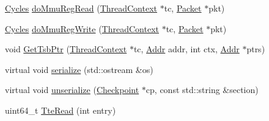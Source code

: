 \begin{DoxyCompactItemize}
\item 
\hyperlink{classCycles}{Cycles} \hyperlink{classSparcISA_1_1TLB_ac90a1eb3091d70b4d1465154d799db46}{doMmuRegRead} (\hyperlink{classThreadContext}{ThreadContext} $\ast$tc, \hyperlink{classPacket}{Packet} $\ast$pkt)
\item 
\hyperlink{classCycles}{Cycles} \hyperlink{classSparcISA_1_1TLB_acdfde16dc50b29fe74f4b7c3f9711d43}{doMmuRegWrite} (\hyperlink{classThreadContext}{ThreadContext} $\ast$tc, \hyperlink{classPacket}{Packet} $\ast$pkt)
\item 
void \hyperlink{classSparcISA_1_1TLB_ab52a39898286d036febd5dcb6d0b376a}{GetTsbPtr} (\hyperlink{classThreadContext}{ThreadContext} $\ast$tc, \hyperlink{base_2types_8hh_af1bb03d6a4ee096394a6749f0a169232}{Addr} addr, int ctx, \hyperlink{base_2types_8hh_af1bb03d6a4ee096394a6749f0a169232}{Addr} $\ast$ptrs)
\item 
virtual void \hyperlink{classSparcISA_1_1TLB_a53e036786d17361be4c7320d39c99b84}{serialize} (std::ostream \&os)
\item 
virtual void \hyperlink{classSparcISA_1_1TLB_af22e5d6d660b97db37003ac61ac4ee49}{unserialize} (\hyperlink{classCheckpoint}{Checkpoint} $\ast$cp, const std::string \&section)
\item 
uint64\_\-t \hyperlink{classSparcISA_1_1TLB_a62b717ca770fe6713cdde68d76694f44}{TteRead} (int entry)
\end{DoxyCompactItemize}
